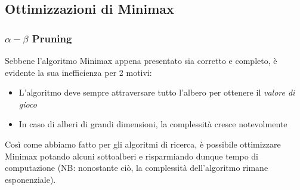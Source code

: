 \subsection{Ottimizzazioni di Minimax}
\subsubsection{$\alpha-\beta$ Pruning}
Sebbene l'algoritmo Minimax appena presentato sia corretto e completo, è evidente la sua inefficienza per 2 motivi:
\begin{itemize}
    \item L'algoritmo deve sempre attraversare tutto l'albero per ottenere il \textit{valore di gioco}
    \item In caso di alberi di grandi dimensioni, la complessità cresce notevolmente
\end{itemize}
Così come abbiamo fatto per gli algoritmi di ricerca, è possibile ottimizzare Minimax potando alcuni sottoalberi e risparmiando
dunque tempo di computazione (NB: nonostante ciò, la complessità dell'algoritmo rimane esponenziale).


